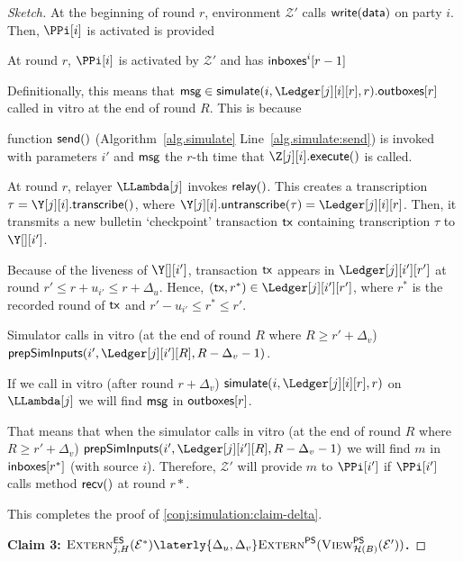 \begin{proof}[Sketch]
  At the beginning of round $r$, environment $\mathcal{Z}'$
  calls $\textsf{write}(\textsf{data})$ on party $i$.
  Then, $\PPi[i]$ is activated
  is provided

  At round $r$, $\PPi[i]$ is activated by $\mathcal{Z}'$ and
  has $\textsf{inboxes}^i[r - 1]$

  Definitionally, this means that $\msg \in \simulate(i, \Ledger[j][i][r], r).\outboxes[r]$
  called in vitro at the end of round $R$. This is because

  function $\textsf{send}()$ (Algorithm~\ref{alg.simulate} Line~\ref{alg.simulate:send}) is invoked
  with parameters $i'$ and $\textsf{msg}$ the $r$-th time that $\Z[j][i].\execute()$ is called.

  At round $r$, relayer $\LLambda[j]$ invokes $\textsf{relay}()$.
  This creates a transcription $\tau = \Y[j][i].\transcribe()$, where
  $\Y[j][i].\untranscribe(\tau) = \Ledger[j][i][r]$.
  Then, it transmits a new bulletin `checkpoint'
  transaction $\textsf{tx}$ containing transcription $\tau$ to $\Y[][i']$.

  Because of the liveness of $\Y[][i']$,
  transaction $\textsf{tx}$ appears in $\Ledger[j][i'][r']$
  at round $r' \leq r + u_{i'} \leq r + \Delta_u$.
  Hence, $(\tx, r^*) \in \Ledger[j][i'][r']$, where $r^*$ is the recorded round of $\textsf{tx}$ and $r' - u_{i'}\leq r^* \leq r'$.

  Simulator calls in vitro (at the end of round $R$ where
  $R \geq r' + \Delta_v$) $\prepareSimulationInputs(i', \Ledger[j][i'][R], R - \Delta_v - 1)$.

  If we call in vitro
  (after round $r + \Delta_v$) $\simulate(i, \Ledger[j][i][r], r)$
  on $\LLambda[j]$ we will find $\textsf{msg}$ in $\textsf{outboxes}[r]$.

  That means that when the simulator calls in vitro
  (at the end of round $R$ where $R \geq r' + \Delta_v$) $\prepareSimulationInputs(i', \Ledger[j][i'][R], R - \Delta_v - 1)$
  we will find $m$ in $\textsf{inboxes}[r^*]$ (with source $i$).
  Therefore, $\mathcal{Z}'$ will provide $m$ to $\PPi[i']$
  if $\PPi[i']$ calls method $\textsf{recv}()$ at round $r*$.

  This completes the proof of \ref{conj:simulation:claim-delta}.



  \noindent
  \textbf{Claim 3: $\LCExtern_{j,H}(\mathcal{E}^*) \laterly{\Delta_u,\Delta_v} \PEExtern(\PEView_{\mathcal{H}(B)}(\mathcal{E}'))$.}


\end{proof}
